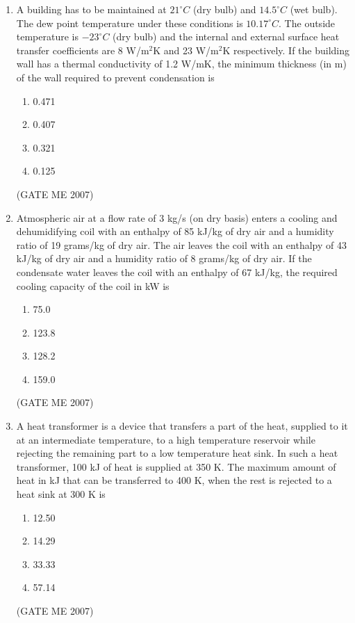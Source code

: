 \documentclass[journal]{IEEEtran}
\begin{document}
\begin{enumerate}
\item A building has to be maintained at \( 21^\circ C \) (dry bulb) and \( 14.5^\circ C \) (wet bulb). The dew point temperature under these conditions is \( 10.17^\circ C \). The outside temperature is \( -23^\circ C \) (dry bulb) and the internal and external surface heat transfer coefficients are 8 W/m\(^2\)K and 23 W/m\(^2\)K respectively. If the building wall has a thermal conductivity of 1.2 W/mK, the minimum thickness (in m) of the wall required to prevent condensation is
\begin{multicols}{4}
\begin{enumerate}
\item 0.471
\item 0.407
\item 0.321
\item 0.125
\end{enumerate}
\end{multicols}
\hfill (GATE ME 2007)

\item Atmospheric air at a flow rate of 3 kg/s (on dry basis) enters a cooling and dehumidifying coil with an enthalpy of 85 kJ/kg of dry air and a humidity ratio of 19 grams/kg of dry air. The air leaves the coil with an enthalpy of 43 kJ/kg of dry air and a humidity ratio of 8 grams/kg of dry air. If the condensate water leaves the coil with an enthalpy of 67 kJ/kg, the required cooling capacity of the coil in kW is
\begin{multicols}{4}
\begin{enumerate}
\item 75.0
\item 123.8
\item 128.2
\item 159.0
\end{enumerate}
\end{multicols}
\hfill (GATE ME 2007)

\item A heat transformer is a device that transfers a part of the heat, supplied to it at an intermediate temperature, to a high temperature reservoir while rejecting the remaining part to a low temperature heat sink. In such a heat transformer, 100 kJ of heat is supplied at 350 K. The maximum amount of heat in kJ that can be transferred to 400 K, when the rest is rejected to a heat sink at 300 K is
\begin{multicols}{4}
\begin{enumerate}
\item 12.50
\item 14.29
\item 33.33
\item 57.14
\end{enumerate}
\end{multicols}
\hfill (GATE ME 2007)


\end{enumerate}
\end{document}
